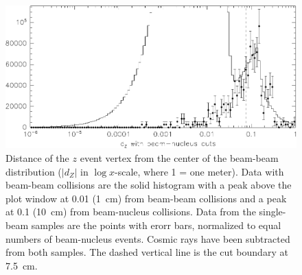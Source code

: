 \documentclass{cornell}
\begin{document}
\begin{figure}[p]
  \begin{center}
    \includegraphics[width=\linewidth]{plots/dxydzcontaminationb}
  \end{center}
  \caption[Projecting beam-nucleus magnitude into accepted data using
  the single-beam samples]{\label{dxydzcontaminationb} Distance of the $z$ event
  vertex from the center of the beam-beam distribution ($|d_Z|$ in
  $\log x$-scale, where 1 = one meter).  Data with beam-beam
  collisions are the solid histogram with a peak above the plot window
  at 0.01 (1~cm) from beam-beam collisions and a peak at 0.1 (10~cm)
  from beam-nucleus collisions.  Data from the single-beam samples are
  the points with erorr bars, normalized to equal numbers of
  beam-nucleus events.  Cosmic rays have been subtracted from both
  samples.  The dashed vertical line is the cut boundary at 7.5~cm.}
\end{figure}
\end{document}
